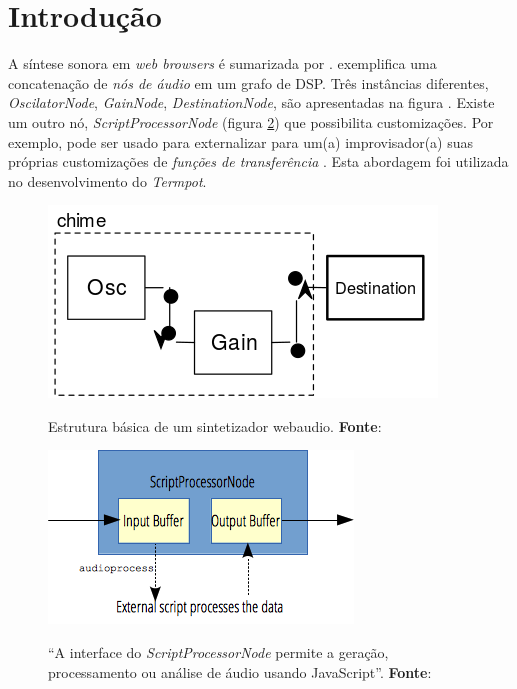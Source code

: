 \section{Introdução}\label{sec:introducao}




A síntese sonora em \emph{web browsers} é sumarizada por \cite{w3c_web_2012,roberts_web_2013-,wyse_viability_2014}. \cite{srikumar_tamming_2013} exemplifica uma concatenação de \emph{nós de áudio} em um grafo de DSP. Três instâncias diferentes, \emph{OscilatorNode}, \emph{GainNode}, \emph{DestinationNode}, são apresentadas na figura \label{fig:chime}. Existe um outro nó, \emph{ScriptProcessorNode} (figura \ref{fig:scriptprocessor}) que possibilita customizações. Por exemplo, pode ser usado para externalizar para um(a) improvisador(a) suas próprias customizações de \emph{funções de transferência} \cite{mathews_groove_1970}. Esta abordagem foi utilizada no desenvolvimento do \emph{Termpot}.

\begin{figure}[!h]
\centering
\caption{Estrutura básica de um sintetizador webaudio. \textbf{Fonte}: \cite{srikumar_tamming_2013}}
\includegraphics[scale=0.3]{chime.png}
\label{fig:chime}  
\end{figure}


\begin{figure}[!h]
\centering
\caption{``A interface do \emph{ScriptProcessorNode} permite a geração, processamento ou análise de áudio usando JavaScript''. \textbf{Fonte}: \cite{w3c_web_2012}}
\includegraphics[scale=0.6]{WebAudioScriptProcessingNode.png}
\label{fig:scriptprocessor} 
\end{figure}


